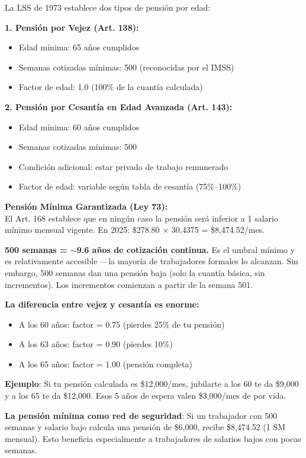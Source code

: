 \documentclass[11pt,a4paper]{report}
\begin{document}
\begin{tcolorbox}[colback=blue!5!white, colframe=blue!75!black, title=\textbf{Definici\'on Formal}]
La LSS de 1973 establece dos tipos de pensi\'on por edad:

\textbf{1. Pensi\'on por Vejez (Art. 138):}
\begin{itemize}[nosep]
\item Edad m\'inima: 65 a\~nos cumplidos
\item Semanas cotizadas m\'inimas: 500 (reconocidas por el IMSS)
\item Factor de edad: 1.0 (100\% de la cuant\'ia calculada)
\end{itemize}

\textbf{2. Pensi\'on por Cesant\'ia en Edad Avanzada (Art. 143):}
\begin{itemize}[nosep]
\item Edad m\'inima: 60 a\~nos cumplidos
\item Semanas cotizadas m\'inimas: 500
\item Condici\'on adicional: estar privado de trabajo remunerado
\item Factor de edad: variable seg\'un tabla de cesant\'ia (75\%--100\%)
\end{itemize}

\textbf{Pensi\'on M\'inima Garantizada (Ley 73):}\\
El Art. 168 establece que en ning\'un caso la pensi\'on ser\'a inferior a 1 salario m\'inimo mensual vigente. En 2025: \$278.80 $\times$ 30.4375 = \$8,474.52/mes.
\end{tcolorbox}

\begin{tcolorbox}[colback=green!5!white, colframe=green!50!black, title=\textbf{Intuici\'on}]
\textbf{500 semanas = $\sim$9.6 a\~nos de cotizaci\'on continua.} Es el umbral m\'inimo y es relativamente accesible ---la mayor\'ia de trabajadores formales lo alcanzan. Sin embargo, 500 semanas dan una pensi\'on baja (solo la cuant\'ia b\'asica, sin incrementos). Los incrementos comienzan a partir de la semana 501.

\textbf{La diferencia entre vejez y cesant\'ia es enorme:}
\begin{itemize}[nosep]
\item A los 60 a\~nos: factor = 0.75 (pierdes 25\% de tu pensi\'on)
\item A los 63 a\~nos: factor = 0.90 (pierdes 10\%)
\item A los 65 a\~nos: factor = 1.00 (pensi\'on completa)
\end{itemize}

\textbf{Ejemplo}: Si tu pensi\'on calculada es \$12,000/mes, jubilarte a los 60 te da \$9,000 y a los 65 te da \$12,000. Esos 5 a\~nos de espera valen \$3,000/mes de por vida.

\textbf{La pensi\'on m\'inima como red de seguridad}: Si un trabajador con 500 semanas y salario bajo calcula una pensi\'on de \$6,000, recibe \$8,474.52 (1 SM mensual). Esto beneficia especialmente a trabajadores de salarios bajos con pocas semanas.
\end{tcolorbox}
\end{document}
